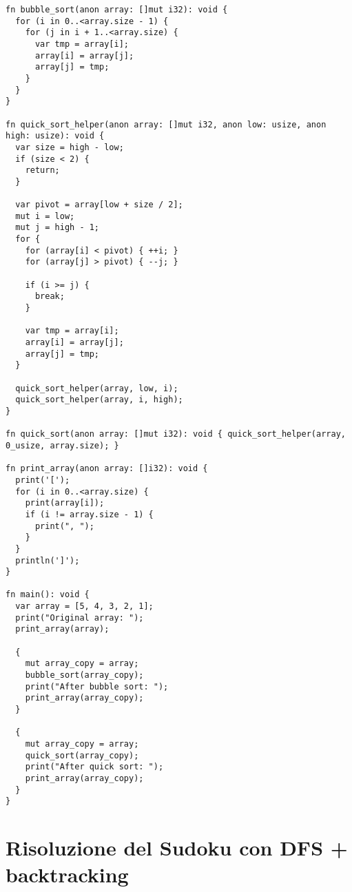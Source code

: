 \begin{mdframed}[style=examplestyle]
	\begin{verbatim}
fn bubble_sort(anon array: []mut i32): void {
  for (i in 0..<array.size - 1) {
    for (j in i + 1..<array.size) {
      var tmp = array[i];
      array[i] = array[j];
      array[j] = tmp;
    }
  }
}

fn quick_sort_helper(anon array: []mut i32, anon low: usize, anon high: usize): void {
  var size = high - low;
  if (size < 2) {
    return;
  }

  var pivot = array[low + size / 2];
  mut i = low;
  mut j = high - 1;
  for {
    for (array[i] < pivot) { ++i; }
    for (array[j] > pivot) { --j; }

    if (i >= j) {
      break;
    }

    var tmp = array[i];
    array[i] = array[j];
    array[j] = tmp;
  }

  quick_sort_helper(array, low, i);
  quick_sort_helper(array, i, high);
}

fn quick_sort(anon array: []mut i32): void { quick_sort_helper(array, 0_usize, array.size); }

fn print_array(anon array: []i32): void {
  print('[');
  for (i in 0..<array.size) {
    print(array[i]);
    if (i != array.size - 1) {
      print(", ");
    }
  }
  println(']');
}

fn main(): void {
  var array = [5, 4, 3, 2, 1];
  print("Original array: ");
  print_array(array);

  {
    mut array_copy = array;
    bubble_sort(array_copy);
    print("After bubble sort: ");
    print_array(array_copy);
  }

  {
    mut array_copy = array;
    quick_sort(array_copy);
    print("After quick sort: ");
    print_array(array_copy);
  }
}
	\end{verbatim}
\end{mdframed}

\section{Risoluzione del Sudoku con DFS + backtracking}
\label{sec:sudoku-example}

\hfill

